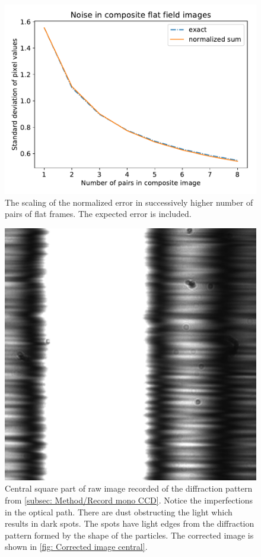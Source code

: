 \documentclass{emulateapj}
\begin{document}
\begin{figure}
	\centering
	\includegraphics[width=\linewidth]{./pythonscripts/noise_composite.pdf}
	\caption[Normalized noise]{The scaling of the normalized error in successively higher number of pairs of flat frames. The expected error is included.}
	\label{fig: Normalized noise}
\end{figure}

\begin{figure}
	\centering
	\includegraphics[scale=0.6]{./pythonscripts/raw_I.pdf}
	\caption[Raw image]{Central square part of raw image recorded of the diffraction pattern from \cref{subsec: Method/Record mono CCD}. Notice the imperfections in the optical path. There are dust obstructing the light which results in dark spots. The spots have light edges from the diffraction pattern formed by the shape of the particles. The corrected image is shown in \cref{fig: Corrected image central}.}
	\label{fig: Raw image central}
\end{figure}%
\end{document}
